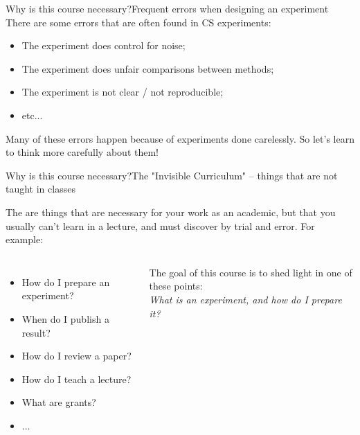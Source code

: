 \documentclass[aspectratio=169]{beamer}
\begin{document}
\begin{CJK}{UTF8}{ipxm}
\begin{frame}{Why is this course necessary?}{Frequent errors when designing an experiment}
  There are some errors that are often found in CS experiments:
  \bigskip

  \begin{itemize}
    \item The experiment does control for noise;\\
    \item The experiment does unfair comparisons between methods;\\
    \item The experiment is not clear / not reproducible;\\
    \item etc...
  \end{itemize}\bigskip

  Many of these errors happen because of experiments done carelessly. So let's learn to think more carefully about them!


\end{frame}

\begin{frame}{Why is this course necessary?}{The "Invisible Curriculum" -- things that are not taught in classes}

  The  are things that are necessary for your work as an academic, but that you usually can't learn in a lecture, and must discover by \alert{trial and error}. For example:\bigskip

  \begin{columns}
    \begin{itemize}
      \item How do I prepare an experiment?
      \item When do I publish a result?
      \item How do I review a paper?
      \item How do I teach a lecture?
      \item What are grants?
      \item ...
    \end{itemize}\bigskip

    The goal of this course is to shed light in one of these points:\\
    \emph{What is an experiment, and how do I prepare it?}


\end{columns}
\end{frame}
\end{CJK}
\end{document}

